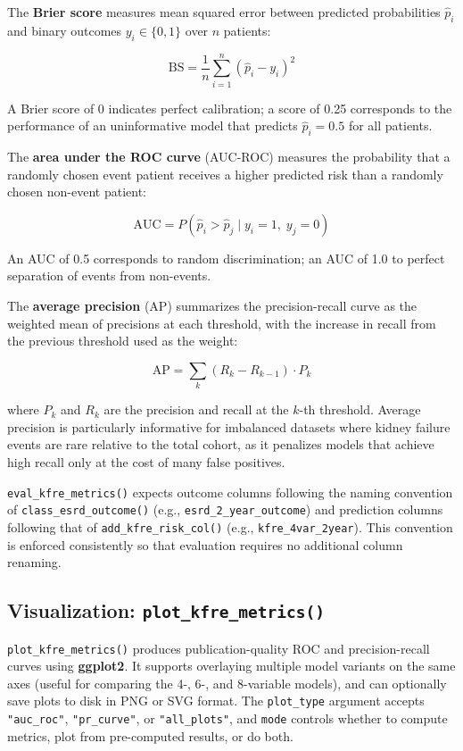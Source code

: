 The \textbf{Brier score} measures mean squared error between predicted probabilities
\(\hat{p}_i\) and binary outcomes \(y_i \in \{0, 1\}\) over \(n\) patients:

\[
\text{BS} = \frac{1}{n} \sum_{i=1}^{n} (\hat{p}_i - y_i)^2
\]

A Brier score of 0 indicates perfect calibration; a score of 0.25 corresponds
to the performance of an uninformative model that predicts \(\hat{p}_i = 0.5\)
for all patients.

The \textbf{area under the ROC curve} (AUC-ROC) measures the probability that a
randomly chosen event patient receives a higher predicted risk than a randomly
chosen non-event patient:

\[
\text{AUC} = P(\hat{p}_i > \hat{p}_j \mid y_i = 1,\; y_j = 0)
\]

An AUC of 0.5 corresponds to random discrimination; an AUC of 1.0 to perfect
separation of events from non-events.

The \textbf{average precision} (AP) summarizes the precision-recall curve as the
weighted mean of precisions at each threshold, with the increase in recall
from the previous threshold used as the weight:

\[
\text{AP} = \sum_{k} (R_k - R_{k-1}) \cdot P_k
\]

where \(P_k\) and \(R_k\) are the precision and recall at the \(k\)-th threshold.
Average precision is particularly informative for imbalanced datasets where
kidney failure events are rare relative to the total cohort, as it penalizes
models that achieve high recall only at the cost of many false positives.

\texttt{eval\_kfre\_metrics()} expects outcome columns following the naming convention
of \texttt{class\_esrd\_outcome()} (e.g., \texttt{esrd\_2\_year\_outcome}) and prediction columns
following that of \texttt{add\_kfre\_risk\_col()} (e.g., \texttt{kfre\_4var\_2year}). This
convention is enforced consistently so that evaluation requires no additional
column renaming.

\subsection{\texorpdfstring{Visualization: \texttt{plot\_kfre\_metrics()}}{Visualization: plot\_kfre\_metrics()}}\label{visualization-plot_kfre_metrics}

\texttt{plot\_kfre\_metrics()} produces publication-quality ROC and precision-recall
curves using \textbf{ggplot2}. It supports overlaying multiple model variants on
the same axes (useful for comparing the 4-, 6-, and 8-variable models), and can
optionally save plots to disk in PNG or SVG format. The \texttt{plot\_type} argument
accepts \texttt{"auc\_roc"}, \texttt{"pr\_curve"}, or \texttt{"all\_plots"}, and \texttt{mode} controls
whether to compute metrics, plot from pre-computed results, or do both.

